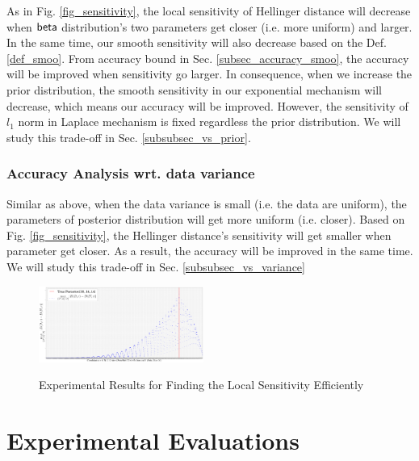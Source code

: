 \documentclass[sigconf]{acmart}
\begin{document}
As in Fig. \ref{fig_sensitivity}, the local sensitivity of Hellinger distance will decrease when $\mathsf{beta}$ distribution's two parameters get closer (i.e. more uniform) and larger. In the same time, our smooth sensitivity will also decrease based on the Def. \ref{def_smoo}. From accuracy bound in Sec. \ref{subsec_accuracy_smoo}, the accuracy will be improved when sensitivity go larger. In consequence, when we increase the prior distribution, the smooth sensitivity in our exponential mechanism will decrease, which means our accuracy will be improved. However, the sensitivity of $l_1$ norm in Laplace mechanism is fixed regardless the prior distribution. We will study this trade-off in Sec. \ref{subsubsec_vs_prior}.

\subsubsection{Accuracy Analysis wrt. data variance}

Similar as above, when the data variance is small (i.e. the data are uniform), the parameters of posterior distribution will get more uniform (i.e. closer). Based on Fig. \ref{fig_sensitivity}, the Hellinger distance's sensitivity will get smaller when parameter get closer. As a result, the accuracy will be improved in the same time. We will study this trade-off in Sec. \ref{subsubsec_vs_variance}


\begin{figure}[ht]
\centering
\includegraphics[width=0.48\textwidth]{efficiency}
\label{fig_efficiency}
\caption{Experimental Results for Finding the Local Sensitivity Efficiently}
\end{figure}


\section{Experimental Evaluations}
\label{sec_experiment}
\end{document}
